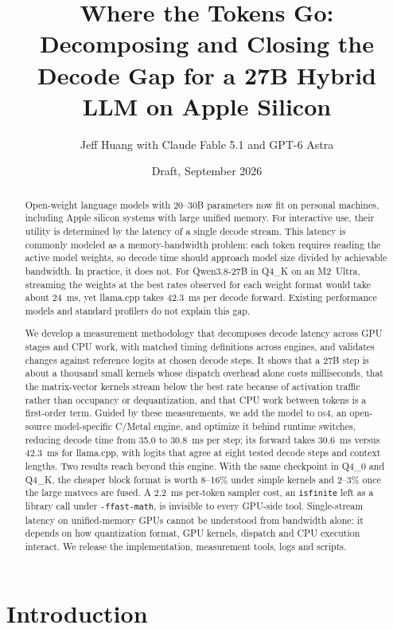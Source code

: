 \documentclass[11pt]{article}
\title{Where the Tokens Go: Decomposing and Closing the Decode Gap for a 27B Hybrid LLM on Apple Silicon}
\author{Jeff Huang with Claude Fable 5.1 and GPT-6 Astra}
\date{Draft, September 2026}
\newcommand{\ds}{\textsc{ds4}}
\begin{document}
\maketitle

\begin{abstract}
Open-weight language models with 20--30B parameters now fit on personal
machines, including Apple silicon systems with large unified memory. For
interactive use, their utility is determined by the latency of a single
decode stream. This latency is commonly modeled as a memory-bandwidth
problem: each token requires reading the active model weights, so decode
time should approach model size divided by achievable bandwidth. In
practice, it does not. For Qwen3.8-27B in Q4\_K on an M2~Ultra, streaming
the weights at the best rates observed for each weight format would take
about 24~ms, yet llama.cpp takes 42.3~ms per decode forward. Existing
performance models and standard profilers do not explain this gap.

We develop a measurement methodology that decomposes decode latency across
GPU stages and CPU work, with matched timing definitions across engines,
and validates changes against reference logits at chosen decode steps. It
shows that a 27B step is about a thousand small kernels whose dispatch
overhead alone costs milliseconds, that the matrix-vector kernels stream
below the best rate because of activation traffic rather than occupancy or
dequantization, and that CPU work between tokens is a first-order term.
Guided by these measurements, we add the model to \ds{}, an open-source
model-specific C/Metal engine, and optimize it behind runtime switches,
reducing decode time from 35.0 to 30.8~ms per step; its forward takes
30.6~ms versus 42.3~ms for llama.cpp, with logits that agree at eight
tested decode steps and context lengths. Two results reach beyond this
engine. With the same checkpoint in Q4\_0 and Q4\_K, the cheaper block
format is worth 8--16\% under simple kernels and 2--3\% once the large
matvecs are fused. A 2.2~ms per-token sampler cost, an \texttt{isfinite}
left as a library call under \texttt{-ffast-math}, is invisible to every
GPU-side tool. Single-stream latency on unified-memory GPUs cannot be
understood from bandwidth alone: it depends on how quantization format, GPU
kernels, dispatch and CPU execution interact. We release the
implementation, measurement tools, logs and scripts.
\end{abstract}

\section{Introduction}
\label{sec:intro}
\end{document}
